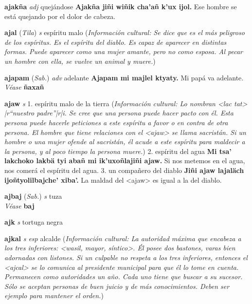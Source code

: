 \documentclass[10pt]{scrbook}
\newcommand{\entry}[1]{\textbf{#1}}
\newcommand{\onedefinition}[1]{#1.}
\newcommand{\partofspeech}[1]{\textit{#1}}
\newcommand{\spanishtranslation}[1]{#1}
\newcommand{\cholexample}[1]{\textbf{#1}}
\newcommand{\exampletranslation}[1]{#1}
\newcommand{\alsosee}[1]{\\\textit{Véase} \textbf{#1}}
\newcommand{\relevantdialect}[1]{(\textit{#1})}
\newcommand{\culturalinformation}[1]{(\textit{#1})}
\begin{document}
\begin{multicols}{2}
\entry{ajakña}
\partofspeech{adj}
\spanishtranslation{quejándose}
\cholexample{Ajakña jiñi wiñik cha'añ k'ux ijol.}
\exampletranslation{Ese hombre se está quejando por el dolor de cabeza.}

\entry{ajal}
\relevantdialect{Tila}
\partofspeech{s}
\spanishtranslation{espíritu malo}
\culturalinformation{Información cultural: Se dice que es el más peligroso de los espíritus. Es el espíritu del diablo. Es capaz de aparecer en distintas formas. Puede aparecer como una mujer amante, pero no como esposa. Al pecar un hombre con ella, se vuelve un animal y muere.}

\entry{ajapam}
\relevantdialect{Sab.}
\partofspeech{adv}
\spanishtranslation{adelante}
\cholexample{Ajapam mi majlel ktyaty.}
\exampletranslation{Mi papá va adelante.}
\alsosee{ñaxañ}

\entry{ajaw}
\partofspeech{s}
\onedefinition{1}
\spanishtranslation{espíritu malo de la tierra}
\culturalinformation{Información cultural: Lo nombran <lac tat> |r“nuestro padre”|r|i. Se cree que una persona puede hacer pacto con él. Esta persona puede hacerle peticiones a este espíritu a favor o en contra de otra persona. El hombre que tiene relaciones con el <ajaw> se llama sacristán. Si un hombre o una mujer ofende al sacristán, él acude a este espíritu para maldecir a la persona, y al poco tiempo la persona muere.}
\onedefinition{2}
\spanishtranslation{espíritu del agua}
\cholexample{Mi tsa' lakchoko lakbä tyi abañ mi ik'uxoñlajiñi ajaw.}
\exampletranslation{Si nos metemos en el agua, nos comerá el espíritu del agua.}
\onedefinition{3}
\spanishtranslation{un compañero del diablo}
\cholexample{Jiñi ajaw lajaläch ijoñtyolilbajche' xiba'.}
\exampletranslation{La maldad del <ajaw> es igual a la del diablo.}

\entry{ajbaj}
\relevantdialect{Sab.}
\partofspeech{s}
\spanishtranslation{tuza}
\alsosee{baj}

\entry{ajk}
\partofspeech{s}
\spanishtranslation{tortuga negra}

\entry{ajkal}
\partofspeech{s esp}
\spanishtranslation{alcalde}
\culturalinformation{Información cultural: La autoridad máxima que encabeza a los tres inferiores: <wasil, mayor, síntico>. Él posee dos bastones, varas bien adornadas con listones. Si un culpable no respeta a los tres inferiores, entonces el <ajcal> se lo comunica al presidente municipal para que él lo tome en cuenta. Permanecen como autoridades un año. Cada uno tiene que buscar a su sucesor. Sólo se aceptan personas de buen juicio y de más conocimientos. Deben ser ejemplo para mantener el orden.}


\end{multicols}
\end{document}
